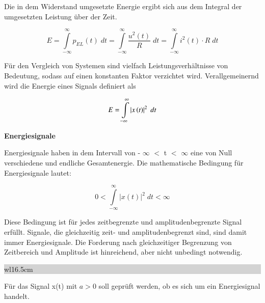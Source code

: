 \noindent Die in dem Widerstand umgesetzte Energie ergibt sich aus dem Integral der umgesetzten Leistung \"{u}ber der Zeit.

\begin{equation}\label{eq:onefive}
E=\int\limits _{-\infty }^{\infty }p_{EL} \left(t\right) \; dt =\int\limits _{-\infty }^{\infty }\dfrac{u^{2} \left(t\right)}{R} \; dt =\int\limits _{-\infty }^{\infty }i^{2} \left(t\right)\cdot R\;dt 
\end{equation}

\noindent F\"{u}r den Vergleich von Systemen sind vielfach Leistungsverh\"{a}ltnisse von Bedeutung, sodass auf einen konstanten Faktor verzichtet wird. Verallgemeinernd wird die Energie eines Signals definiert als 

\begin{equation}\label{eq:onesix}
E=\int\limits _{-\infty }^{\infty }\left|x\left(t\right)\right|^{2} {\rm \; }dt
\end{equation}

\medskip

{\selectfont
\noindent\textbf{Energiesignale}} \smallskip

\noindent Energiesignale haben in dem Intervall von - $\infty$ $\mathrm{<}$ t $\mathrm{<}$ $\infty$ eine von Null verschiedene und endliche Gesamtenergie. Die mathematische Bedingung f\"{u}r Energiesignale lautet:

\begin{equation}\label{eq:oneseven}
0<\int\limits _{-\infty }^{\infty }\left|x\left(t\right)\right|^{2} \; dt<\infty
\end{equation}


\noindent Diese Bedingung ist f\"{u}r jedes zeitbegrenzte und amplitudenbegrenzte Signal erf\"{u}llt. Signale, die gleichzeitig zeit- und amplitudenbegrenzt sind, sind damit immer Energiesignale. Die Forderung nach gleichzeitiger Begrenzung von Zeitbereich und Amplitude ist hinreichend, aber nicht unbedingt notwendig.\\

\noindent
\colorbox{lightgray}{%
%
\renewcommand\arraystretch{0.6}%
\begin{tabular}{ wl{16.5cm} }
{\selectfont
{}} \smallskip
\end{tabular}%
}\bigskip

\noindent F\"{u}r das Signal x(t) mit  $a >  0$ soll gepr\"{u}ft werden, ob es sich um ein Energiesignal handelt.

